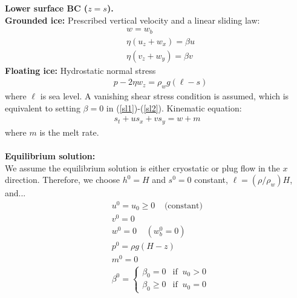 \documentclass[paper=a4, fontsize=11pt]{article}
\begin{document}
\noindent\textbf{Lower surface BC ($z=s$).}\\
\textbf{Grounded ice:}
Prescribed vertical velocity and a linear sliding law:
\begin{align}
&w  = w_b\\
&\eta(u_z + w_x) = \beta u \label{sl1} \\
&\eta(v_z + w_y) = \beta v \label{sl2}
\end{align}
\textbf{Floating ice:}
Hydrostatic normal stress
\begin{align}
&p-2\eta w_z  = \rho_w g(\ell-s)
\end{align}
where $\ell$ is sea level. A vanishing shear stress condition is assumed,
which is equivalent to setting $\beta=0$ in (\ref{sl1})-(\ref{sl2}).
\noindent Kinematic equation:
\begin{align}
s_t + us_x + vs_y  = w + m
\end{align}
where $m$ is the melt rate.\\ \\
\noindent\textbf{Equilibrium solution:}\\
We assume the equilibrium solution is either cryostatic or plug flow in the $x$ direction.
Therefore, we choose $h^0=H$ and $s^0=0$ constant, $\ell=(\rho/\rho_w)H$, and...
\begin{align}
&u^0 = u_0\geq 0\;\;\;\; \text{(constant)} \\
& v^0 = 0 \\
&w^0 = 0 \;\;\;\; (w_b^0=0)\\
&p^0 = \rho g (H-z) \\
& m^0 = 0\\
&\beta^0  = \begin{cases}
\beta_0 = 0 & \text{if} \;\; u_0>0 \\
\beta_0 \geq 0 & \text{if} \;\; u_0 =0
\end{cases}
\end{align}
\end{document}
